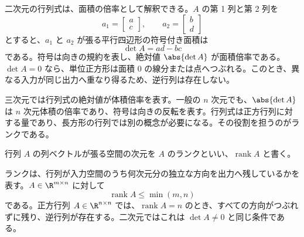 二次元の行列式は、面積の倍率として解釈できる。$A$ の第 1 列と第 2 列を
\begin{equation}
  a_1=\begin{bmatrix}a\\c\end{bmatrix},
  \qquad
  a_2=\begin{bmatrix}b\\d\end{bmatrix}
\end{equation}
とすると、$a_1$ と $a_2$ が張る平行四辺形の符号付き面積は
\begin{equation}
  \det A=ad-bc
\end{equation}
である。符号は向きの規約を表し、絶対値 $\abs{\det A}$ が面積倍率である。$\det A=0$ なら、単位正方形は面積 0 の線分または点へつぶれる。このとき、異なる入力が同じ出力へ重なり得るため、逆行列は存在しない。

三次元では行列式の絶対値が体積倍率を表す。一般の $n$ 次元でも、$\abs{\det A}$ は $n$ 次元体積の倍率であり、符号は向きの反転を表す。行列式は正方行列に対する量であり、長方形の行列では別の概念が必要になる。その役割を担うのがランクである。

\begin{definition}[ランク]
行列 $A$ の列ベクトルが張る空間の次元を $A$ のランクといい、$\operatorname{rank}A$ と書く。
\end{definition}

ランクは、行列が入力空間のうち何次元分の独立な方向を出力へ残しているかを表す。$A\in\R^{m\times n}$ に対して
\begin{equation}
  \operatorname{rank}A\le\min(m,n)
\end{equation}
である。正方行列 $A\in\R^{n\times n}$ では、$\operatorname{rank}A=n$ のとき、すべての方向がつぶれずに残り、逆行列が存在する。二次元ではこれは $\det A\ne0$ と同じ条件である。

